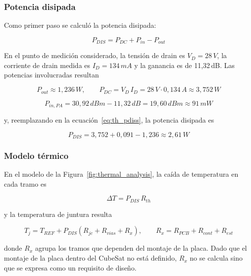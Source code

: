\subsubsection{Potencia disipada}
Como primer paso se calculó la potencia disipada:

\begin{equation}
    P_{DIS} = P_{DC} + P_{in} - P_{out}
    \label{eq:th_pdiss}
\end{equation}

En el punto de medición considerado, la tensión de drain es $V_D = 28\,V$, la corriente de drain medida es $I_D = 134\,mA$ y la ganancia es de 11,32\,dB. Las potencias involucradas resultan

\begin{equation}
    P_{out} \approx 1,236\,W, \qquad P_{DC} = V_D \, I_D = 28\,V \cdot 0,134\,A \approx 3,752\,W
    \label{eq:th_pout_pdc}
\end{equation}

\begin{equation}
    P_{in,PA} = 30,92\,dBm - 11,32\,dB = 19,60\,dBm \approx 91\,mW
    \label{eq:th_pin}
\end{equation}

y, reemplazando en la ecuación~\eqref{eq:th_pdiss}, la potencia disipada es

\begin{equation}
    P_{DIS} = 3,752 + 0,091 - 1,236 \approx 2,61\,W
    \label{eq:th_pdiss_valor}
\end{equation}

\subsubsection{Modelo térmico}
En el modelo de la Figura~\ref{fig:thermal_analysis}, la caída de temperatura en cada tramo es

\begin{equation}
    \Delta T = P_{DIS} \, R_{th}
    \label{eq:th_deltaT}
\end{equation}

y la temperatura de juntura resulta

\begin{equation}
    T_j = T_{REF} + P_{DIS}\left(R_{jc} + R_{vias} + R_x\right), \qquad R_x = R_{PCB} + R_{cont} + R_{est}
    \label{eq:th_tj}
\end{equation}

donde $R_x$ agrupa los tramos que dependen del montaje de la placa. Dado que el montaje de la placa dentro del CubeSat no está definido, $R_x$ no se calcula sino que se expresa como un requisito de diseño.

